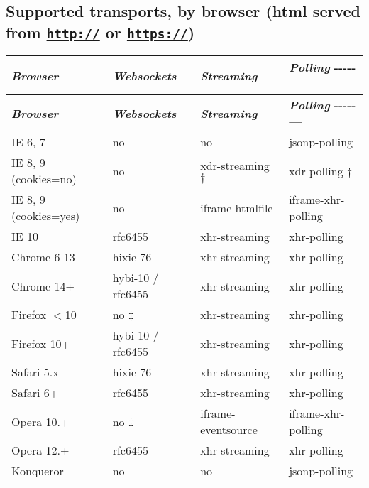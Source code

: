 \subsection*{Supported transports, by browser (html served from \href{http://}{\tt http\+://} or \href{https://}{\tt https\+://}) }

\tabulinesep=1mm
\begin{longtabu} spread 0pt [c]{*{4}{|X[-1]}|}
\hline
\rowcolor{\tableheadbgcolor}\textbf{ {\itshape Browser}  }&\textbf{ {\itshape Websockets}  }&\textbf{ {\itshape Streaming}  }&\textbf{ {\itshape Polling} -\/-\/-\/-\/-\/---   }\\
\endfirsthead
\hline
\endfoot
\hline
\rowcolor{\tableheadbgcolor}\textbf{ {\itshape Browser}  }&\textbf{ {\itshape Websockets}  }&\textbf{ {\itshape Streaming}  }&\textbf{ {\itshape Polling} -\/-\/-\/-\/-\/---   }\\
\endhead
IE 6, 7  &no  &no  &jsonp-\/polling   \\
IE 8, 9 (cookies=no)  &no  &xdr-\/streaming {$\dagger$}  &xdr-\/polling {$\dagger$}   \\
IE 8, 9 (cookies=yes)  &no  &iframe-\/htmlfile  &iframe-\/xhr-\/polling   \\
IE 10  &rfc6455  &xhr-\/streaming  &xhr-\/polling   \\
Chrome 6-\/13  &hixie-\/76  &xhr-\/streaming  &xhr-\/polling   \\
Chrome 14+  &hybi-\/10 / rfc6455  &xhr-\/streaming  &xhr-\/polling   \\
Firefox $<$10  &no {$\ddagger$}  &xhr-\/streaming  &xhr-\/polling   \\
Firefox 10+  &hybi-\/10 / rfc6455  &xhr-\/streaming  &xhr-\/polling   \\
Safari 5.\+x  &hixie-\/76  &xhr-\/streaming  &xhr-\/polling   \\
Safari 6+  &rfc6455  &xhr-\/streaming  &xhr-\/polling   \\
Opera 10.+  &no {$\ddagger$}  &iframe-\/eventsource  &iframe-\/xhr-\/polling   \\
Opera 12.+  &rfc6455  &xhr-\/streaming  &xhr-\/polling   \\
Konqueror  &no  &no  &jsonp-\/polling   \\
\end{longtabu}



